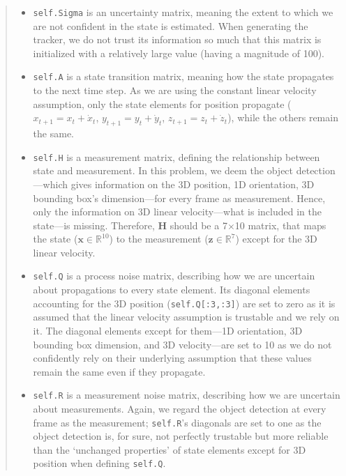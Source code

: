 \documentclass[11pt]{article}
\begin{document}
\begin{quote}
\begin{itemize}
    \item \texttt{self.Sigma} is an uncertainty matrix, meaning the extent to which we are not confident in the state is estimated. When generating the tracker, we do not trust its information so much that this matrix is initialized with a relatively large value (having a magnitude of 100).
    \item \texttt{self.A} is a state transition matrix, meaning how the state propagates to the next time step. As we are using the constant linear velocity assumption, only the state elements for position propagate ($x_{t+1} = x_{t} + \dot{x}_{t}$, $y_{t+1} = y_{t} + \dot{y}_{t}$, $z_{t+1} = z_{t} + \dot{z}_{t}$), while the others remain the same.
    \item \texttt{self.H} is a measurement matrix, defining the relationship between state and measurement. In this problem, we deem the object detection---which gives information on the 3D position, 1D orientation, 3D bounding box's dimension---for every frame as measurement. Hence, only the information on 3D linear velocity---what is included in the state---is missing. Therefore, $\mathbf{H}$ should be a 7$\times$10 matrix, that maps the state ($\mathbf{x} \in \mathbb{R}^{10}$) to the measurement ($\mathbf{z} \in \mathbb{R}^7$) except for the 3D linear velocity.
    \item \texttt{self.Q} is a process noise matrix, describing how we are uncertain about propagations to every state element. Its diagonal elements accounting for the 3D position (\texttt{self.Q[:3,:3]}) are set to zero as it is assumed that the linear velocity assumption is trustable and we rely on it. The diagonal elements except for them---1D orientation, 3D bounding box dimension, and 3D velocity---are set to 10 as we do not confidently rely on their underlying assumption that these values remain the same even if they propagate.
    \item \texttt{self.R} is a measurement noise matrix, describing how we are uncertain about measurements. Again, we regard the object detection at every frame as the measurement; \texttt{self.R}'s diagonals are set to one as the object detection is, for sure, not perfectly trustable but more reliable than the `unchanged properties' of state elements except for 3D position when defining \texttt{self.Q}.
\end{itemize}

\end{quote}
\end{document}
